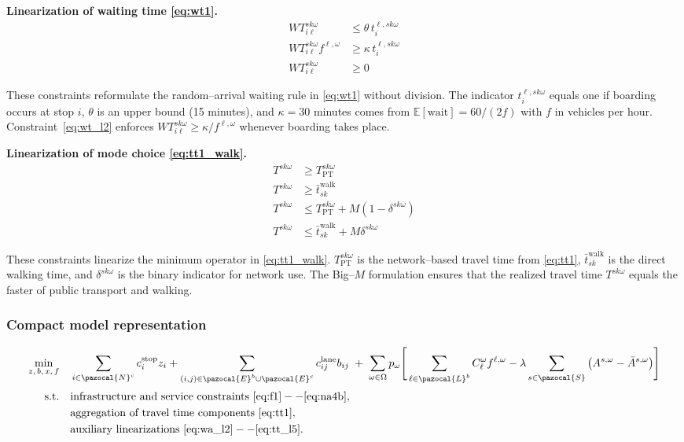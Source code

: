 \documentclass[3p,times,procedia]{elsarticle}
\begin{document}
\textbf{Linearization of waiting time \eqref{eq:wt1}.}
\begin{align}
WT_{i\ell}^{sk\omega} &\le \theta \, t_{i}^{\ell,sk\omega} \label{eq:wt_l1}\\
WT_{i\ell}^{sk\omega} f^{\ell,\omega} &\ge \kappa \, t_{i}^{\ell,sk\omega} \label{eq:wt_l2}\\
WT_{i\ell}^{sk\omega} &\ge 0 \label{eq:wt_l3}
\end{align}

These constraints reformulate the random–arrival waiting rule in \eqref{eq:wt1} without division.  
The indicator $t_{i}^{\ell,sk\omega}$ equals one if boarding occurs at stop $i$, $\theta$ is an upper bound (15 minutes), and $\kappa=30$ minutes comes from $\mathbb{E}[\text{wait}]=60/(2f)$ with $f$ in vehicles per hour.  
Constraint~\eqref{eq:wt_l2} enforces $WT_{i\ell}^{sk\omega} \ge \kappa/f^{\ell,\omega}$ whenever boarding takes place.


\textbf{Linearization of mode choice \eqref{eq:tt1_walk}.}
\begin{align}
T^{sk\omega} &\ge T_{\text{PT}}^{sk\omega} \label{eq:tt_l2}\\
T^{sk\omega} &\ge \bar{t}_{sk}^{\text{walk}} \label{eq:tt_l3}\\
T^{sk\omega} &\le T_{\text{PT}}^{sk\omega} + M (1 - \delta^{sk\omega}) \label{eq:tt_l4}\\
T^{sk\omega} &\le \bar{t}_{sk}^{\text{walk}} + M \delta^{sk\omega} \label{eq:tt_l5}
\end{align}

These constraints linearize the minimum operator in \eqref{eq:tt1_walk}.  
$T_{\text{PT}}^{sk\omega}$ is the network–based travel time from \eqref{eq:tt1}, $\bar{t}_{sk}^{\text{walk}}$ is the direct walking time, and $\delta^{sk\omega}$ is the binary indicator for network use.  
The Big–$M$ formulation ensures that the realized travel time $T^{sk\omega}$ equals the faster of public transport and walking.

\subsubsection{Compact model representation}\label{sec:model}
\begin{align}
\min_{z,\,b,\,x,\,f}\quad 
& \sum_{i \in \pazocal{N}^c} c_i^{\text{stop}} z_i
  + \sum_{(i,j) \in \pazocal{E}^b \cup \pazocal{E}^c} c_{ij}^{\text{lane}} b_{ij}
\;+\;
\sum_{\omega \in \Omega} p_\omega \Bigg[
    \sum_{\ell \in \pazocal{L}^b} C_{\ell}^{\omega} f^{\ell,\omega}
    - \lambda \sum_{s \in \pazocal{S}} \big(A^{s,\omega} - \bar{A}^{s,\omega}\big)
\Bigg]
\label{eq:obj_compact_final}
\\[2pt]
\text{s.t.}\quad
& \text{infrastructure and service constraints } \eqref{eq:f1}--\eqref{eq:na4b}, \notag\\
& \text{aggregation of travel time components } \eqref{eq:tt1}, \notag\\
& \text{auxiliary linearizations } \eqref{eq:wa_l2}--\eqref{eq:tt_l5}. \notag
\end{align}
\end{document}
